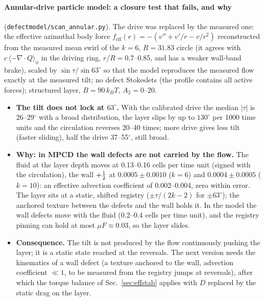 \paragraph{Annular-drive particle model: a closure test that fails, and why} (\texttt{defectmodel/scan\_annular.py}).
The drive was replaced by the measured one: the effective azimuthal body force $f_\mathrm{eff}(r)=-(v''+v'/r-v/r^2)$ reconstructed from the measured mean swirl of the
$k=6$, $R=31.83$ circle (it agrees with $c\,\langle-\nabla\!\cdot Q\rangle_\phi$ in the driving ring, $r/R=0.7$--0.85, and has a weaker wall-band brake), scaled by
$\sin\tau/\sin63^\circ$ so that the model reproduces the measured flow exactly at the measured tilt; no defect Stokeslets (the profile contains all active forces);
structured layer, $B=90\,k_BT$, $A_2=0$--20.
\begin{itemize}
  \item \textbf{The tilt does not lock at $63^\circ$.} With the calibrated drive the median $|\tau|$ is 26--29$^\circ$ with a broad distribution, the layer slips by up to
        $130^\circ$ per 1000 time units and the circulation reverses 20--40 times; more drive gives less tilt (faster sliding), half the drive 37--55$^\circ$, still broad.
  \item \textbf{Why: in MPCD the wall defects are not carried by the flow.} The fluid at the layer depth moves at 0.13--0.16 cells per time unit (signed with the circulation),
        the wall $+\tfrac12$ at $0.0005\pm0.0010$ ($k=6$) and $0.0004\pm0.0005$ ($k=10$): an effective advection coefficient of 0.002--0.004, zero within error. The layer sits
        at a static, shifted registry ($\pm\tau/(2k-2)$ for $\pm63^\circ$); the anchored texture between the defects and the wall holds it. In the model the wall
        defects move with the fluid (0.2--0.4 cells per time unit), and the registry pinning can hold at most $\mu F\approx0.03$, so the layer slides.
  \item \textbf{Consequence.} The tilt is not produced by the flow continuously pushing the layer; it is a static state reached at the reversals. The next version
        needs the kinematics of a wall defect (a texture anchored to the wall, advection coefficient $\ll1$, to be measured from the registry jumps at reversals), after
        which the torque balance of Sec.~\ref{sec:effstab} applies with $D$ replaced by the static drag on the layer.
\end{itemize}

